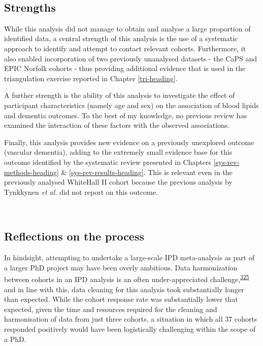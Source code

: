 \documentclass[a4paper, twoside]{templates/ociamthesis}
\begin{document}
~

\hypertarget{strengths-1}{%
\subsection{Strengths}\label{strengths-1}}

While this analysis did not manage to obtain and analyse a large proportion of identified data, a central strength of this analysis is the use of a systematic approach to identify and attempt to contact relevant cohorts. Furthermore, it also enabled incorporation of two previously unanalysed datasets - the CaPS and EPIC Norfolk cohorts - thus providing additional evidence that is used in the triangulation exercise reported in Chapter \ref{tri-heading}.

A further strength is the ability of this analysis to investigate the effect of participant characteristics (namely age and sex) on the association of blood lipids and dementia outcomes. To the best of my knowledge, no previous review has examined the interaction of these factors with the observed associations.

Finally, this analysis provides new evidence on a previously unexplored outcome (vascular dementia), adding to the extremely small evidence base for this outcome identified by the systematic review presented in Chapters \ref{sys-rev-methods-heading} \& \ref{sys-rev-results-heading}. This is relevant even in the previously analysed WhiteHall II cohort because the previous analysis by Tynkkynen \emph{et al.} did not report on this outcome.

~

\hypertarget{reflections-on-the-process}{%
\subsection{Reflections on the process}\label{reflections-on-the-process}}

In hindsight, attempting to undertake a large-scale IPD meta-analysis as part of a larger PhD project may have been overly ambitious. Data harmonization between cohorts in an IPD analysis is an often under-appreciated challenge,\textsuperscript{\protect\hyperlink{ref-levis2021}{325}} and in line with this, data cleaning for this analysis took substantially longer than expected. While the cohort response rate was substantially lower that expected, given the time and resources required for the cleaning and harmonisation of data from just three cohorts, a situation in which all 37 cohorts responded positively would have been logistically challenging within the scope of a PhD.
\end{document}
